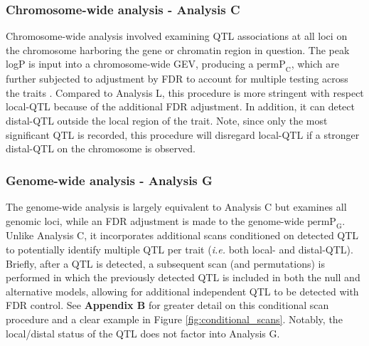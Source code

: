 \documentclass[9pt,twocolumn,twoside]{gsajnl}
\newcommand{\ie}{\emph{i.e.}\xspace}
\newcommand{\permpc}{\text{permP}_{\text{C}}}
\newcommand{\permpg}{\text{permP}_{\text{G}}}
\newcommand{\WV}[2]{\textcolor{red}{#1\footnote{\textcolor{red}{WV: #2}}}}
\begin{document}

\subsubsection{Chromosome-wide analysis - Analysis C} 
Chromosome-wide analysis involved examining QTL associations at all loci on the chromosome harboring the gene or chromatin region in question. The peak logP is input into a chromosome-wide GEV, producing a $\permpc$, which are further subjected to adjustment by FDR to account for multiple testing across the traits \citep{Chesler2005}. 
Compared to Analysis L, this procedure is more stringent with respect local-QTL because of the additional FDR adjustment. In addition, it can detect distal-QTL outside the local region of the trait. 
Note, since only the most significant QTL is recorded, this procedure will disregard local-QTL if a stronger distal-QTL on the chromosome is observed.


\subsubsection{Genome-wide analysis - Analysis G} 
The genome-wide analysis is largely equivalent to Analysis C but examines all genomic loci, while an FDR adjustment is made to the genome-wide $\permpg$. Unlike Analysis C, it incorporates additional scans conditioned on detected QTL to potentially identify multiple QTL per trait (\ie both local- and distal-QTL). Briefly, after a QTL is detected, a subsequent scan (and permutations) is performed in which the previously detected QTL is included in both the null and alternative models, allowing for additional independent QTL to be detected with FDR control. See \textbf{Appendix B} for greater detail on this conditional scan procedure and a clear example in Figure \ref{fig:conditional_scans}. Notably, the local/distal status of the QTL does not factor into Analysis G.
\end{document}
